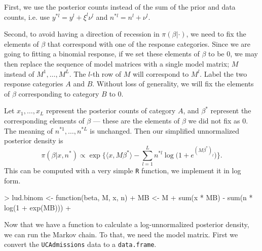 \documentclass{article}
\newcommand{\inner}[1]{\langle #1 \rangle}
\begin{document}
First, we use the posterior counts instead of the sum of the prior and data
counts, i.e. use $y^{*l} = y^l + \xi^l \nu^l$ and $n^{*l} = n^l + \nu^l$.

Second, to avoid having a direction of recession in $\pi(\beta|\cdot)$, we
need to fix the elements of $\beta$ that correspond with one of the
response categories.  Since we are going to fitting a binomial response, if
we set these elements of $\beta$ to be $0$, we may then replace the
sequence of model matrices with a single model matrix; $M$ instead of
$M^1,\dots,M^L$.  The $l$-th row of $M$ will correspond to $M^l$.  Label
the two response categories $A$ and $B$.  Without loss of generality, we
will fix the elements of $\beta$ corresponding to category $B$ to 0.

Let $x_1,\dots,x_L$ represent the posterior counts of category $A$, and
$\beta^*$ represent the corresponding elements of $\beta$ --- these are the
elements of $\beta$ we did not fix as 0.  The meaning of
$n^{*1},\dots,n^{*L}$ is unchanged.  Then our simplified unnormalized
posterior density is
\begin{equation}\label{eq:simplified-posterior}
  \pi(\beta|x,n^*) \propto
  \exp\biggl\{
    \inner{x, M \beta^*}
    -
    \sum_{l=1}^L n^{*l} \log\bigl(1 + e^{(M \beta^*)_l}\bigr)
  \biggr\}.
\end{equation}
This can be computed with a very simple \texttt{R} function, we implement
it in log form.
\begin{Schunk}
\begin{Sinput}
> lud.binom <- function(beta, M, x, n) {
+   MB <- M %*% beta
+   sum(x * MB) - sum(n * log(1 + exp(MB)))
+ }
\end{Sinput}
\end{Schunk}

Now that we have a function to calculate a log-unnormalized posterior
density, we can run the Markov chain.  To that, we need the model matrix.
First we convert the \texttt{UCAdmissions} data to a \texttt{data.frame}.
\begin{Schunk}
\end{Schunk}
\end{document}
